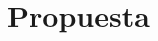 \documentclass[usenames,dvipsnames]{beamer}
\begin{document}








\section{Propuesta}
\end{document}
